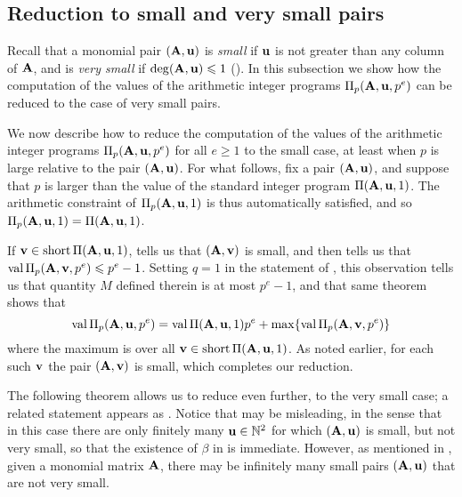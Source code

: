\documentclass{amsart}
\begin{document}
\subsection{Reduction to small and very small pairs}

Recall that a monomial pair $(\mathbf{A}, \mathbf{u})$ is \emph{small} if $\mathbf{u}$ is not greater than any column of $\mathbf{A}$, and is \emph{very small} if $\operatorname{deg}(\mathbf{A},\mathbf{u}) \leqslant 1$ ().
In this subsection we show how the computation of the values of the arithmetic integer programs $\Pi_p(\mathbf{A},\mathbf{u},p^e)$ can be reduced to the case of very small pairs.

\begin{remark}
   We now describe how to reduce the computation of the values of the arithmetic integer programs $\Pi_p(\mathbf{A}, \mathbf{u}, p^e)$ for all $e \geq 1$ to the small case, at least when $p$ is large relative to the pair $(\mathbf{A}, \mathbf{u})$.
   For what follows, fix a pair $(\mathbf{A}, \mathbf{u})$, and suppose that $p$ is larger than the value of the standard integer program $\Pi(\mathbf{A}, \mathbf{u},1)$.
   The arithmetic constraint of $\Pi_p(\mathbf{A},\mathbf{u},1)$ is thus automatically satisfied, and so $\Pi_p(\mathbf{A}, \mathbf{u}, 1) = \Pi(\mathbf{A}, \mathbf{u}, 1)$.

   If $\mathbf{v} \in \operatorname{short} \Pi(\mathbf{A},\mathbf{u},1)$,  tells us that $(\mathbf{A}, \mathbf{v})$ is small, and   then tells us that $\operatorname{val} \Pi_p(\mathbf{A}, \mathbf{v}, p^e) \leqslant p^e-1$.
   Setting $q=1$ in the statement of , this observation tells us that quantity $M$ defined therein is at most $p^e-1$, and that same theorem shows that
   \[ \operatorname{val} \Pi_p(\mathbf{A}, \mathbf{u},p^e) = \operatorname{val} \Pi(\mathbf{A}, \mathbf{u},1)p^e + \max \{ \operatorname{val} \Pi_p(\mathbf{A}, \mathbf{v}, p^e) \}\]
   where the maximum is over all $\mathbf{v} \in \operatorname{short} \Pi(\mathbf{A}, \mathbf{u},1)$.
   As noted earlier, for each such $\mathbf{v}$ the pair $(\mathbf{A},\mathbf{v})$ is small, which completes our reduction.
\end{remark}

The following theorem allows us to reduce even further, to the very small case; a related statement appears as \cite[Theorem~6.4]{hernandez+etal.frobenius_powers}.
Notice that  may be misleading, in the sense that in this case there are only finitely many $\mathbf{u} \in \mathbb{N}^2$ for which $(\mathbf{A}, \mathbf{u})$ is small, but not very small, so that the existence of $\beta$ in  is immediate.
However, as mentioned in , given a monomial matrix $\mathbf{A}$, there may be infinitely many small pairs $(\mathbf{A}, \mathbf{u})$ that are not very small.
\end{document}
